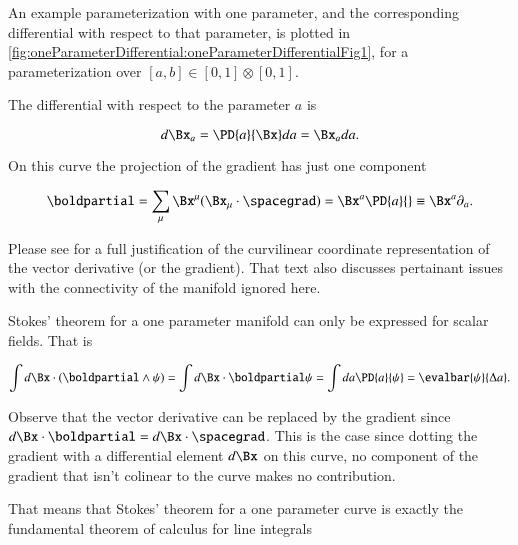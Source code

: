 %
%

An example parameterization with one parameter, and the corresponding differential with respect to that parameter, is plotted in
\cref{fig:oneParameterDifferential:oneParameterDifferentialFig1}, for a parameterization over \( [a, b] \in [0,1]\otimes[0,1] \).


The differential with respect to the parameter \( a \) is

\begin{equation}\label{eqn:stokesTheoremCore:20}
d\Bx_a = \PD{a}{\Bx} da = \Bx_a da.
\end{equation}

On this curve the projection of the gradient has just one component

\begin{dmath}\label{eqn:stokesTheoremCore:40}
\boldpartial
=
\sum_\mu \Bx^\mu (\Bx_\mu \cdot \spacegrad)
=
\Bx^a \PD{a}{}
\equiv
\Bx^a \partial_a.
\end{dmath}

Please see \citep{aMacdonaldVAGC} for a full justification of the curvilinear coordinate representation of the vector derivative (or the gradient).  That text also discusses pertainant issues with the connectivity of the manifold ignored here.

Stokes' theorem for a one parameter manifold can only be expressed for scalar fields.  That is

\begin{dmath}\label{eqn:stokesTheoremCore:60}
\int d\Bx \cdot (\boldpartial \wedge \psi)
=
\int d\Bx \cdot \boldpartial \psi
=
\int da \PD{a}{ \psi }
= \evalbar{\psi}{\Delta a}.
\end{dmath}

Observe that the vector derivative can be replaced by the gradient since \( d\Bx \cdot \boldpartial = d\Bx \cdot \spacegrad \).
This is the case since dotting the
gradient with a differential element \( d\Bx \) on this curve, no component of the gradient that isn't colinear to the curve makes no contribution.

That means that Stokes' theorem for a one parameter curve is exactly the fundamental theorem of calculus for line integrals

